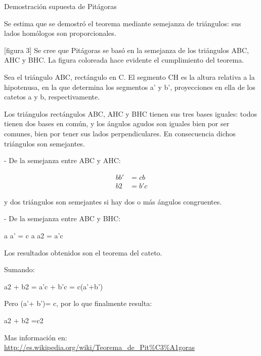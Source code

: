 \documentclass[12pt,letterpaper,twocolumn]{article}
\begin{document}
Demostración supuesta de Pitágoras

Se estima que se demostró el teorema mediante semejanza de triángulos: sus lados homólogos son proporcionales.

[figura 3]
{Se cree que Pitágoras se basó en la semejanza de los triángulos ABC, AHC y BHC. La figura coloreada hace evidente el cumplimiento del teorema.}

Sea el triángulo ABC, rectángulo en C. El segmento CH es la altura relativa a la hipotenusa, en la que determina los segmentos a' y b', proyecciones en ella de los catetos a y b, respectivamente.

Los triángulos rectángulos ABC, AHC y BHC tienen sus tres bases iguales: todos tienen dos bases en común, y los ángulos agudos son iguales bien por ser comunes, bien por tener sus lados perpendiculares. En consecuencia dichos triángulos son semejantes.

- De la semejanza entre ABC y AHC:

\begin{eqnarray}
    b b' & =  c b \\
    b2 & =  b'c
\end{eqnarray}
    
    y dos triángulos son semejantes si hay dos o más ángulos congruentes.

- De la semejanza entre ABC y BHC:

   a a' = c a
     a2 = a'c

Los resultados obtenidos son el teorema del cateto.

Sumando:

     a2 + b2 = a'c + b'c =  c(a'+b')

Pero (a'+ b')= c, por lo que finalmente resulta:

    a2 + b2 =c2
    
Mas información en: \url{http://es.wikipedia.org/wiki/Teorema_de_Pit\%C3\%A1goras}
\end{document}
